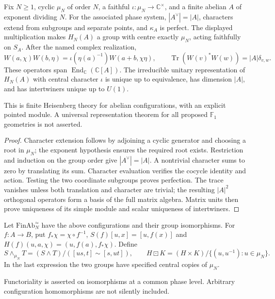 \begin{theorem}
{\normalfont\statusProved}\quad Fix $N\geq1$, cyclic $\mu_N$ of order $N$,
a faithful $\iota:\mu_N\to\mathbb C^\times$, and a finite abelian $A$
of exponent dividing $N$. For the associated phase system,
$|A^\vee|=|A|$, characters extend from subgroups and separate points, and
$\kappa_A$ is perfect. The displayed multiplication makes $H_N(A)$ a
group with centre exactly $\mu_N$, acting faithfully on $S_A$.
After the named complex realization,
\[
W(a,\chi)W(b,\eta)=\iota(\eta(a)^{-1})W(a+b,\chi\eta),\qquad
\operatorname{Tr}(W(v)^*W(w))=|A|\delta_{v,w}.
\]
These operators span $\operatorname{End}_{\mathbb C}(\mathbb C[A])$.
The irreducible unitary representation of $H_N(A)$ with central character
$\iota$ is unique up to equivalence, has dimension $|A|$, and has
intertwiners unique up to $U(1)$.
\end{theorem}
\begin{scope}This is finite Heisenberg theory for abelian configurations,
with an explicit pointed module. A universal representation theorem for
all proposed $\mathbb F_1$ geometries is not asserted.\end{scope}
\begin{proof}
Character extension follows by adjoining a cyclic generator and choosing
a root in $\mu_N$; the exponent hypothesis ensures the required root exists.
Restriction and induction on the group order give $|A^\vee|=|A|$.
A nontrivial character sums to zero by translating its sum. Character
evaluation verifies the cocycle identity and action. Testing the two
coordinate subgroups proves perfection. The trace vanishes unless both
translation and character are trivial; the resulting $|A|^2$ orthogonal
operators form a basis of the full matrix algebra. Matrix units then prove
uniqueness of its simple module and scalar uniqueness of intertwiners.
\end{proof}

\begin{definition}
Let $\mathrm{FinAb}_N^{\simeq}$ have the above configurations and their
group isomorphisms. For $f:A\to B$, put
$f_*\chi=\chi\circ f^{-1}$,
$S(f)[u,x]=[u,f(x)]$ and
$H(f)(u,a,\chi)=(u,f(a),f_*\chi)$.
Define
\[
S\wedge_{\mu_N}T=(S\wedge T)/([us,t]\sim[s,ut]),\qquad
H\boxdot K=(H\times K)/\{(u,u^{-1}):u\in\mu_N\}.
\]
In the last expression the two groups have specified central copies of
$\mu_N$.
\end{definition}
\begin{scope}Functoriality is asserted on isomorphisms at a common phase
level. Arbitrary configuration homomorphisms are not silently included.\end{scope}

